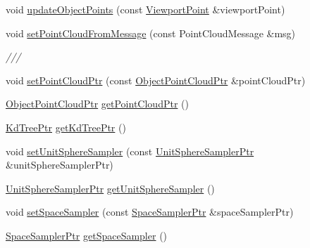 \begin{DoxyCompactItemize}
\item 
void \hyperlink{classnext__best__view_1_1NextBestViewCalculator_a8c78f8b100cd7bd781bd6890b98b710b}{update\-Object\-Points} (const \hyperlink{namespacenext__best__view_adc2a48dc71f39dea04334b16d75a8e34}{\-Viewport\-Point} \&viewport\-Point)
\item 
void \hyperlink{classnext__best__view_1_1NextBestViewCalculator_abd0df021aacd30cb092a879b875cc639}{set\-Point\-Cloud\-From\-Message} (const \-Point\-Cloud\-Message \&msg)
\begin{DoxyCompactList}\small\item\em /// \end{DoxyCompactList}\item 
void \hyperlink{classnext__best__view_1_1NextBestViewCalculator_ac34821aae2b9120165a1cf0605b422de}{set\-Point\-Cloud\-Ptr} (const \hyperlink{namespacenext__best__view_af8b3b448f67ab117bb7c59bc7c34f0b3}{\-Object\-Point\-Cloud\-Ptr} \&point\-Cloud\-Ptr)
\item 
\hyperlink{namespacenext__best__view_af8b3b448f67ab117bb7c59bc7c34f0b3}{\-Object\-Point\-Cloud\-Ptr} \hyperlink{classnext__best__view_1_1NextBestViewCalculator_ad9ad5d603acaf4e67184a8855bf18869}{get\-Point\-Cloud\-Ptr} ()
\item 
\hyperlink{namespacenext__best__view_aab5cd60b86a4a57ae8c69c2e2570679f}{\-Kd\-Tree\-Ptr} \hyperlink{classnext__best__view_1_1NextBestViewCalculator_a4548e087d890aa7ab8d41f20e2bd58e7}{get\-Kd\-Tree\-Ptr} ()
\item 
void \hyperlink{classnext__best__view_1_1NextBestViewCalculator_aef5624aeaec1b999a3c90f9557af1b9b}{set\-Unit\-Sphere\-Sampler} (const \hyperlink{namespacenext__best__view_ad3328c7d2bb2185c972df039061ad6f5}{\-Unit\-Sphere\-Sampler\-Ptr} \&unit\-Sphere\-Sampler\-Ptr)
\item 
\hyperlink{namespacenext__best__view_ad3328c7d2bb2185c972df039061ad6f5}{\-Unit\-Sphere\-Sampler\-Ptr} \hyperlink{classnext__best__view_1_1NextBestViewCalculator_a761207de26f962e0437107c06a716b5e}{get\-Unit\-Sphere\-Sampler} ()
\item 
void \hyperlink{classnext__best__view_1_1NextBestViewCalculator_a8e4fb71df53008e7a23f028f1531dfa0}{set\-Space\-Sampler} (const \hyperlink{namespacenext__best__view_af3d0f8204bad3e34940c86ba619815cc}{\-Space\-Sampler\-Ptr} \&space\-Sampler\-Ptr)
\item 
\hyperlink{namespacenext__best__view_af3d0f8204bad3e34940c86ba619815cc}{\-Space\-Sampler\-Ptr} \hyperlink{classnext__best__view_1_1NextBestViewCalculator_a4641467bbfa8d652c9d93e0589af7b22}{get\-Space\-Sampler} ()

\end{DoxyCompactItemize}

